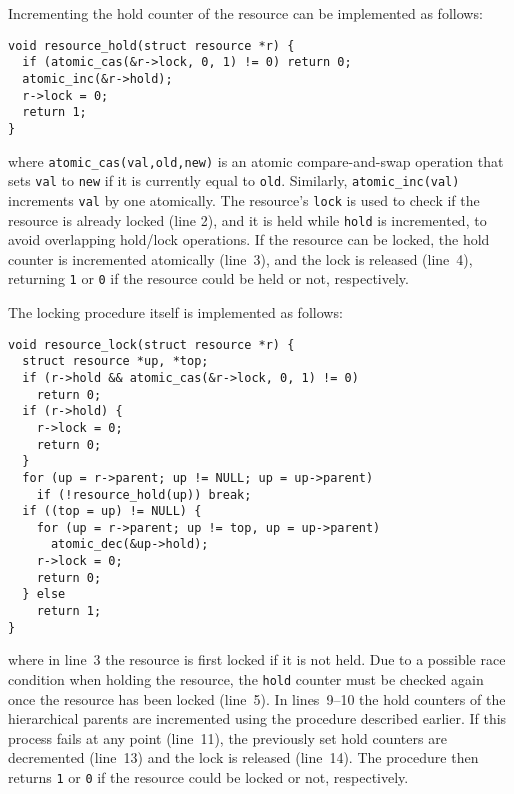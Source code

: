 \documentclass[preprint]{elsarticle}
\begin{document}
Incrementing the hold counter of the resource can be implemented
as follows:
\begin{center}\begin{minipage}{0.9\textwidth}
    \begin{lstlisting}
void resource_hold(struct resource *r) {
  if (atomic_cas(&r->lock, 0, 1) != 0) return 0;
  atomic_inc(&r->hold);
  r->lock = 0;
  return 1;
}
    \end{lstlisting}
\end{minipage}\end{center}
\noindent where {\tt atomic\_cas(val,old,new)} is an atomic
compare-and-swap operation that sets {\tt val} to {\tt new}
if it is currently equal to {\tt old}.
Similarly, {\tt atomic\_inc(val)} increments {\tt val} by one
atomically.
The resource's {\tt lock} is used to check if the resource
is already locked (line 2), and it is held while {\tt hold}
is incremented, to avoid overlapping hold/lock operations.
If the resource can be locked, the hold counter is incremented
atomically (line~3), and the lock is released (line~4),
returning {\tt 1} or {\tt 0} if the resource could be held
or not, respectively.

The locking procedure itself is implemented as follows:
\begin{center}\begin{minipage}{0.9\textwidth}
    \begin{lstlisting}
void resource_lock(struct resource *r) {
  struct resource *up, *top;
  if (r->hold && atomic_cas(&r->lock, 0, 1) != 0)
    return 0;
  if (r->hold) {
    r->lock = 0;
    return 0;
  }
  for (up = r->parent; up != NULL; up = up->parent)
    if (!resource_hold(up)) break;
  if ((top = up) != NULL) {
    for (up = r->parent; up != top, up = up->parent)
      atomic_dec(&up->hold);
    r->lock = 0;
    return 0;
  } else
    return 1;
}
    \end{lstlisting}
\end{minipage}\end{center}
\noindent where in line~3 the resource is first locked if it
is not held.
Due to a possible race condition when holding the resource,
the {\tt hold} counter must be checked again once the resource
has been locked (line~5).
In lines~9--10 the hold counters of the hierarchical parents
are incremented using the procedure described earlier.
If this process fails at any point (line~11), the
previously set hold counters are decremented (line~13)
and the lock is released (line~14).
The procedure then returns {\tt 1} or {\tt 0} if the resource
could be locked or not, respectively.
\end{document}
